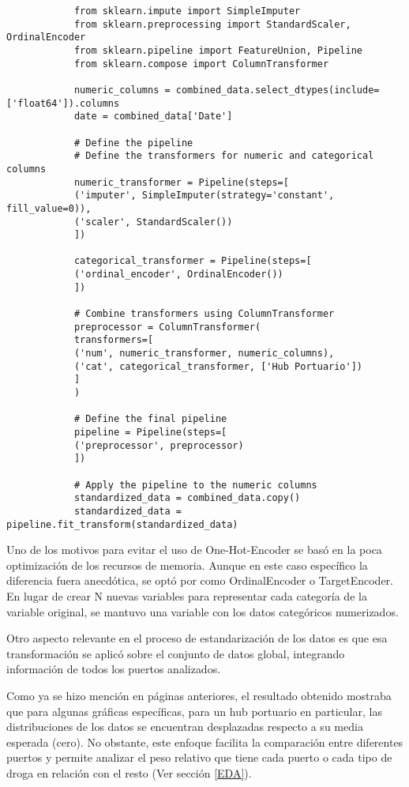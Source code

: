 \documentclass[12pt]{article}
\begin{document}
		\begin{verbatim}
			from sklearn.impute import SimpleImputer
			from sklearn.preprocessing import StandardScaler, OrdinalEncoder
			from sklearn.pipeline import FeatureUnion, Pipeline
			from sklearn.compose import ColumnTransformer
			
			numeric_columns = combined_data.select_dtypes(include=['float64']).columns
			date = combined_data['Date']
			
			# Define the pipeline
			# Define the transformers for numeric and categorical columns
			numeric_transformer = Pipeline(steps=[
			('imputer', SimpleImputer(strategy='constant', fill_value=0)),
			('scaler', StandardScaler())
			])
			
			categorical_transformer = Pipeline(steps=[
			('ordinal_encoder', OrdinalEncoder())
			])
			
			# Combine transformers using ColumnTransformer
			preprocessor = ColumnTransformer(
			transformers=[
			('num', numeric_transformer, numeric_columns),
			('cat', categorical_transformer, ['Hub Portuario'])
			]
			)
			
			# Define the final pipeline
			pipeline = Pipeline(steps=[
			('preprocessor', preprocessor)
			])
			
			# Apply the pipeline to the numeric columns
			standardized_data = combined_data.copy()
			standardized_data = pipeline.fit_transform(standardized_data)
		\end{verbatim}
	
		Uno de los motivos para evitar el uso de One-Hot-Encoder se basó en la poca optimización de los recursos de memoria. Aunque en este caso específico la diferencia fuera anecdótica, se optó por como OrdinalEncoder o TargetEncoder. En lugar de crear N nuevas variables para representar cada categoría de la variable original, se mantuvo una variable con los datos categóricos numerizados.
		
		Otro aspecto relevante en el proceso de estandarización de los datos es que esa transformación se aplicó sobre el conjunto de datos global, integrando información de todos los puertos analizados. 
		
		Como ya se hizo mención en páginas anteriores, el resultado obtenido mostraba que para algunas gráficas específicas, para un hub portuario en particular, las distribuciones de los datos se encuentran desplazadas respecto a su media esperada (cero). No obstante, este enfoque facilita la comparación entre diferentes puertos y permite analizar el peso relativo que tiene cada puerto o cada tipo de droga en relación con el resto (Ver sección \ref{EDA}).
		
\end{document}
